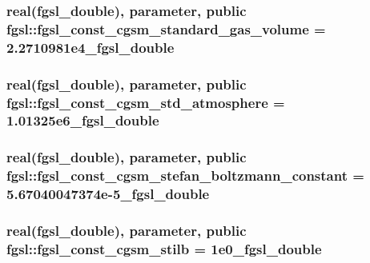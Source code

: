 \hypertarget{classfgsl_ab7cd57aadb050c6aa836b7ab1246f435}{
\subsubsection[{fgsl\-\_\-const\-\_\-cgsm\-\_\-standard\-\_\-gas\-\_\-volume}]{\setlength{\rightskip}{0pt plus 5cm}real({\bf fgsl\-\_\-double}), parameter, public fgsl\-::fgsl\-\_\-const\-\_\-cgsm\-\_\-standard\-\_\-gas\-\_\-volume = 2.\-2710981e4\-\_\-fgsl\-\_\-double}}\label{classfgsl_ab7cd57aadb050c6aa836b7ab1246f435}
\hypertarget{classfgsl_a3da30a3dd34b8f19a5e653e57f41f360}{
\subsubsection[{fgsl\-\_\-const\-\_\-cgsm\-\_\-std\-\_\-atmosphere}]{\setlength{\rightskip}{0pt plus 5cm}real({\bf fgsl\-\_\-double}), parameter, public fgsl\-::fgsl\-\_\-const\-\_\-cgsm\-\_\-std\-\_\-atmosphere = 1.\-01325e6\-\_\-fgsl\-\_\-double}}\label{classfgsl_a3da30a3dd34b8f19a5e653e57f41f360}
\hypertarget{classfgsl_a7b2b26a4a33ccd17f26be17db533b3ac}{
\subsubsection[{fgsl\-\_\-const\-\_\-cgsm\-\_\-stefan\-\_\-boltzmann\-\_\-constant}]{\setlength{\rightskip}{0pt plus 5cm}real({\bf fgsl\-\_\-double}), parameter, public fgsl\-::fgsl\-\_\-const\-\_\-cgsm\-\_\-stefan\-\_\-boltzmann\-\_\-constant = 5.\-67040047374e-\/5\-\_\-fgsl\-\_\-double}}\label{classfgsl_a7b2b26a4a33ccd17f26be17db533b3ac}
\hypertarget{classfgsl_a8f6eb902874b66bc00a4959e7444cb1a}{
\subsubsection[{fgsl\-\_\-const\-\_\-cgsm\-\_\-stilb}]{\setlength{\rightskip}{0pt plus 5cm}real({\bf fgsl\-\_\-double}), parameter, public fgsl\-::fgsl\-\_\-const\-\_\-cgsm\-\_\-stilb = 1e0\-\_\-fgsl\-\_\-double}}\label{classfgsl_a8f6eb902874b66bc00a4959e7444cb1a}
